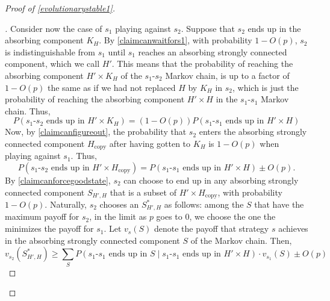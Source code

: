 \documentclass[12pt]{article}
\theoremstyle{definition}
\theoremstyle{remark}
\newenvironment{subproof}[1][\proofname]{%
  \renewcommand{\qedsymbol}{$\blacksquare$}%
  \begin{proof}[#1]%
}{%
  \end{proof}%
}
\begin{document}
\begin{proof}[Proof of \cref{evolutionarystable1}]
\begin{subproof}
        Consider now the case of $s_1$ playing against $s_2$. Suppose that $s_2$ ends up in the absorbing component $K_H$. By \cref{claimcanwaitfors1}, with probability $1 - O(p)$, $s_2$ is indistinguishable from $s_1$ until $s_1$ reaches an absorbing strongly connected component, which we call $H'$.         
        This means that the probability of reaching the absorbing component $H' \times K_H$ of the $s_1$-$s_2$ Markov chain, is up to a factor of $1 - O(p)$ the same as if we had not replaced $H$ by $K_H$ in $s_2$, which is just the probability of reaching the absorbing component $H' \times H$ in the $s_1$-$s_1$ Markov chain. Thus, 
        \begin{equation*}
          P(\text{$s_1$-$s_2$ ends up in $H' \times K_H$}) = (1 - O(p)) P(\text{$s_1$-$s_1$ ends up in $H' \times H$})
        \end{equation*}
        Now, by \cref{claimcanfigureout}, the probability that $s_2$ enters the absorbing strongly connected component $H_\text{copy}$ after having gotten to $K_H$ is $1 - O(p)$ when playing against $s_1$. Thus,
        \begin{equation}
          \label{equationhhcopy}
          P(\text{$s_1$-$s_2$ ends up in $H' \times H_\text{copy}$}) = P(\text{$s_1$-$s_1$ ends up in $H' \times H$}) \pm O(p).
        \end{equation}
        By \cref{claimcanforcegoodstate}, $s_2$ can choose to end up in any absorbing strongly connected component $S_{H', H}$ that is a subset of $H' \times H_\text{copy}$, with probability $1 - O(p)$. 
        Naturally, $s_2$ chooses an $S_{H', H}^*$ as follows: among the $S$ that have the maximum payoff for $s_2$, in the limit as $p$ goes to 0, we choose the one the minimizes the payoff for $s_1$.
        Let $v_{s}(S)$ denote the payoff that strategy $s$ achieves in the absorbing strongly connected component $S$ of the Markov chain. Then,
        \begin{equation}
          \label{imtoootired}
          v_{s_2}(S_{H', H}^*) \geq \sum_{S} P(\text{$s_1$-$s_1$ ends up in $S$} \mid \text{$s_1$-$s_1$ ends up in $H' \times H$}) \cdot v_{s_1}(S) \pm O(p)
        \end{equation}

\end{subproof}
\end{proof}
\end{document}
